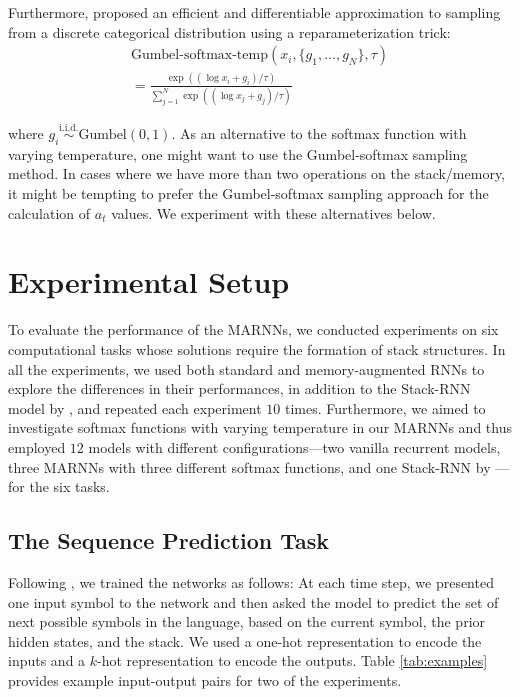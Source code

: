 \documentclass[11pt,a4paper]{article}
\theoremstyle{plain}
\begin{document}
Furthermore, \citet{jang2016categorical} proposed an efficient and differentiable approximation to sampling from a discrete categorical distribution using a reparameterization trick:  
\vspace{-0.5em}
\begin{align*}
    \text{Gumbel-softmax-temp}(x_{i}, \{g_1, \ldots, g_{N}\}, \tau) \\= \frac{\exp((\log x_i + g_i)/\tau)}{\sum_{j=1}^{N} \exp((\log x_j + g_j)/\tau)}
\end{align*}

\noindent where $g_i \overset{\text{i.i.d.}}{\sim} \text{Gumbel} (0, 1)$.
As an alternative to the softmax function with varying temperature, one might want to use the Gumbel-softmax sampling method. In cases where we have more than two operations on the stack/memory, it might be tempting to prefer the Gumbel-softmax sampling approach for the calculation of $a_t$ values. We experiment with these alternatives below.

\vspace{-0.5em}
\section{Experimental Setup}
\vspace{-0.4em}
To evaluate the performance of the MARNNs, we conducted experiments on six computational tasks whose solutions require the formation of stack structures. In all the experiments, we used both standard and memory-augmented RNNs to explore the differences in their performances, in addition to the Stack-RNN model by \citet {joulin2015inferring}, and repeated each experiment $10$ times. Furthermore, we aimed to investigate softmax functions with varying temperature in our MARNNs and thus employed $12$ models with different configurations---two vanilla recurrent models, three MARNNs with three different softmax functions, and one Stack-RNN by \citet{joulin2015inferring}---for the six tasks.

 \subsection{The Sequence Prediction Task}
Following \citet{gers2001lstm}, we trained the networks as follows: At each time step, we presented one input symbol to the network and then asked the model to predict the set of next possible symbols in the language, based on the current symbol, the prior hidden states, and the stack. We used a one-hot representation to encode the inputs and a $k$-hot representation to encode the outputs. Table \ref{tab:examples} provides example input-output pairs for two of the experiments.
\end{document}
